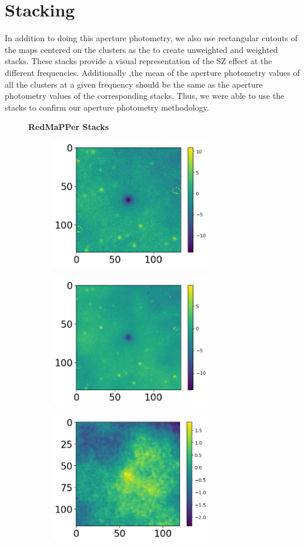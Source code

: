 \documentclass{princeton_astro_thesis}
\begin{document}
\section{Stacking}
In addition to doing this aperture photometry, we also use rectangular cutouts of the maps centered on the clusters as the to create unweighted and weighted stacks. These stacks provide a visual representation of the SZ effect at the different frequencies. Additionally ,the mean of the aperture photometry values of all the clusters at a given frequency should be the same as the aperture photometry values of the corresponding stacks. Thus, we were able to use the stacks to confirm our aperture photometry methodology. 
\begin{figure}[ht]
  \centering
  \textbf{RedMaPPer Stacks}\par\medskip
  \begin{subfigure}[b]{0.5\linewidth}
    \centering\includegraphics[width=200pt]{../f90_redmapper_wstack.png}
    \caption{\label{fig:fig1}}
  \end{subfigure}
  \begin{subfigure}[b]{0.1\linewidth}
    \centering\includegraphics[width=200pt]{../f150_redmapper_wstack.png}
    \caption{\label{fig:fig2}}
  \end{subfigure}
  \begin{subfigure}[b]{0.5\linewidth}
    \centering\includegraphics[width=200pt]{../f217_redmapper_wstack.png}

\end{subfigure}
\end{figure}
\end{document}
